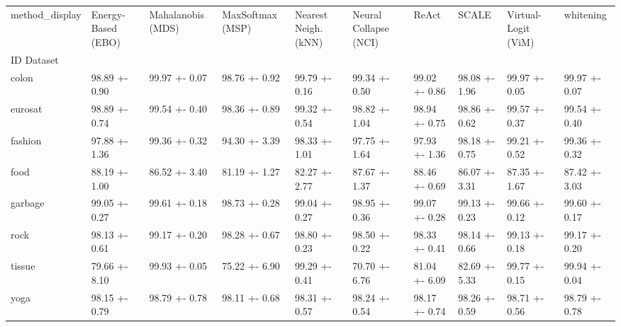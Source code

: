 \begin{tabular}{llllllllll}
\toprule
method_display & Energy-Based (EBO) & Mahalanobis (MDS) & MaxSoftmax (MSP) & Nearest Neigh. (kNN) & Neural Collapse (NCI) & ReAct & SCALE & Virtual-Logit (ViM) & whitening \\
ID Dataset &  &  &  &  &  &  &  &  &  \\
\midrule
colon & 98.89 +- 0.90 & 99.97 +- 0.07 & 98.76 +- 0.92 & 99.79 +- 0.16 & 99.34 +- 0.50 & 99.02 +- 0.86 & 98.08 +- 1.96 & 99.97 +- 0.05 & 99.97 +- 0.07 \\
eurosat & 98.89 +- 0.74 & 99.54 +- 0.40 & 98.36 +- 0.89 & 99.32 +- 0.54 & 98.82 +- 1.04 & 98.94 +- 0.75 & 98.86 +- 0.62 & 99.57 +- 0.37 & 99.54 +- 0.40 \\
fashion & 97.88 +- 1.36 & 99.36 +- 0.32 & 94.30 +- 3.39 & 98.33 +- 1.01 & 97.75 +- 1.64 & 97.93 +- 1.36 & 98.18 +- 0.75 & 99.21 +- 0.52 & 99.36 +- 0.32 \\
food & 88.19 +- 1.00 & 86.52 +- 3.40 & 81.19 +- 1.27 & 82.27 +- 2.77 & 87.67 +- 1.37 & 88.46 +- 0.69 & 86.07 +- 3.31 & 87.35 +- 1.67 & 87.42 +- 3.03 \\
garbage & 99.05 +- 0.27 & 99.61 +- 0.18 & 98.73 +- 0.28 & 99.04 +- 0.27 & 98.95 +- 0.36 & 99.07 +- 0.28 & 99.13 +- 0.23 & 99.66 +- 0.12 & 99.60 +- 0.17 \\
rock & 98.13 +- 0.61 & 99.17 +- 0.20 & 98.28 +- 0.67 & 98.80 +- 0.23 & 98.50 +- 0.22 & 98.33 +- 0.41 & 98.14 +- 0.66 & 99.13 +- 0.18 & 99.17 +- 0.20 \\
tissue & 79.66 +- 8.10 & 99.93 +- 0.05 & 75.22 +- 6.90 & 99.29 +- 0.41 & 70.70 +- 6.76 & 81.04 +- 6.09 & 82.69 +- 5.33 & 99.77 +- 0.15 & 99.94 +- 0.04 \\
yoga & 98.15 +- 0.79 & 98.79 +- 0.78 & 98.11 +- 0.68 & 98.31 +- 0.57 & 98.24 +- 0.54 & 98.17 +- 0.74 & 98.26 +- 0.59 & 98.71 +- 0.56 & 98.79 +- 0.78 \\
\bottomrule
\end{tabular}
